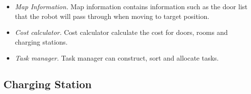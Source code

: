 \begin{itemize}
	\item \textsl{Map Information.} Map information contains information such as the door list that the robot will pass through when moving to target position.
	\item \textsl{Cost calculator.} Cost calculator calculate the cost for doors, rooms and charging stations.
	\item \textsl{Task manager.} Task manager can construct, sort and allocate tasks.
\end{itemize}





\subsection{Charging Station}